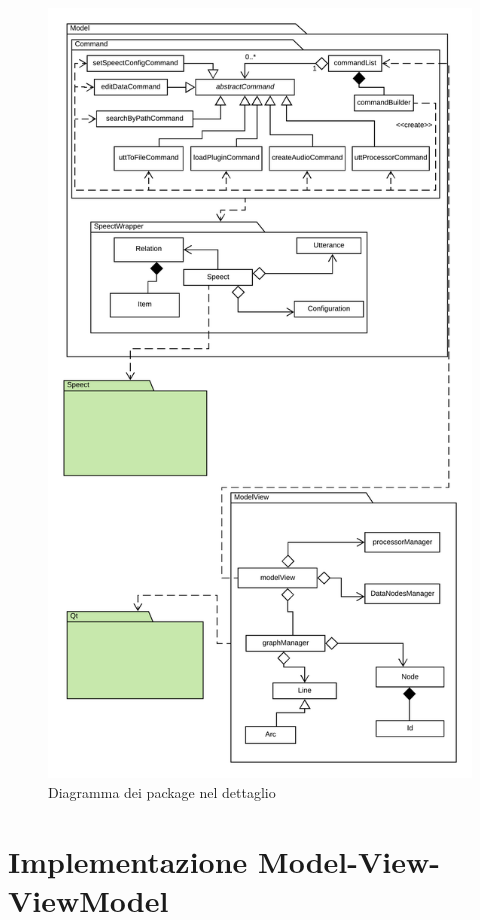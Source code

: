 \documentclass[openany,12pt,a4paper]{report}
\begin{document}
	\begin{figure}[H]
		\includegraphics[scale=0.63]{PackageDiagram2}
		\centering
		\caption{Diagramma dei package nel dettaglio}
	\end{figure}
	
	\section{Implementazione Model-View-ViewModel}
	
\end{document}
